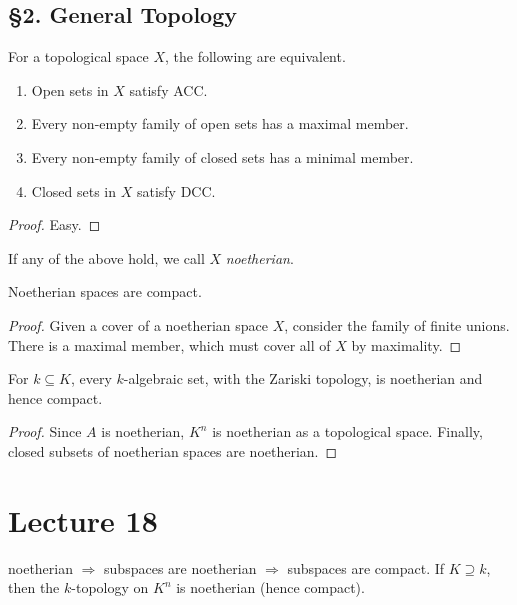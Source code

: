  \subsection{\S 2. General Topology}
 \begin{proposition}
   For a topological space $X$, the following are equivalent.
   \begin{enumerate}
     \item Open sets in $X$ satisfy ACC.
     \item Every non-empty family of open sets has a maximal member.
     \item Every non-empty family of closed sets has a minimal member.
     \item Closed sets in $X$ satisfy DCC.
   \end{enumerate}
 \end{proposition}
 \begin{proof}
   Easy.
 \end{proof}
 \begin{definition}
   If any of the above hold, we call $X$ \emph{noetherian}.
 \end{definition}
 \begin{proposition}
   Noetherian spaces are compact.
 \end{proposition}
 \begin{proof}
   Given a cover of a noetherian space $X$, consider the family of finite unions. There
   is a maximal member, which must cover all of $X$ by maximality.
 \end{proof}
 \begin{corollary}
   For $k\subseteq K$, every $k$-algebraic set, with the Zariski topology, is noetherian
   and hence compact.
 \end{corollary}
 \begin{proof}
   Since $A$ is noetherian, $K^n$ is noetherian as a topological space. Finally, closed
   subsets of noetherian  spaces are noetherian.
 \end{proof}
 \setcounter{lecture}{18}
 \section{Lecture 18}

 noetherian $\Rightarrow$ subspaces are noetherian $\Rightarrow$ subspaces are compact.
 If $K\supseteq k$, then the $k$-topology on $K^n$ is noetherian (hence compact).

